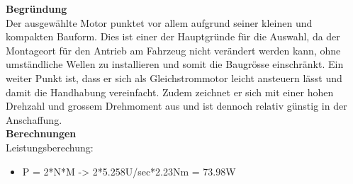 \textbf{Begründung}\\[0.2cm]
Der ausgewählte Motor punktet vor allem aufgrund seiner kleinen und kompakten Bauform. Dies ist einer der Hauptgründe für die Auswahl, da der Montageort für den Antrieb am Fahrzeug nicht verändert werden kann, ohne umständliche Wellen zu installieren und somit die Baugrösse einschränkt.
Ein weiter Punkt ist, dass er sich als Gleichstrommotor leicht ansteuern lässt und damit die Handhabung vereinfacht.
Zudem zeichnet er sich mit einer hohen Drehzahl und grossem Drehmoment aus und ist dennoch relativ günstig in der Anschaffung.\\[0.2cm]
\textbf{Berechnungen}\\[0.2cm]
Leistungsberechung:
\begin{itemize}
\item P = 2*\pi*N*M -> 2*\pi*5.258U/sec*2.23Nm = 73.98W


\end{itemize}